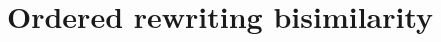 
\section{Ordered rewriting bisimilarity}\label{sec:ordered-bisimilarity:rewriting-bisimilarity}



